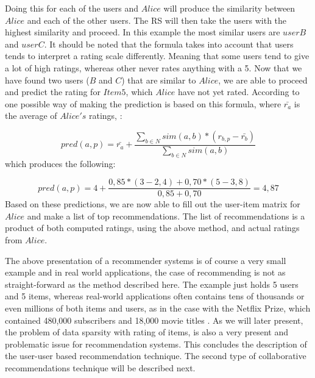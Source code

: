 Doing this for each of the users and \(Alice\) will produce the similarity between \(Alice\) and each of the other users. The RS will then take the users with the highest similarity and proceed. In this example the most similar users are \(userB\) and \(userC\). It should be noted that the formula takes into account that users tends to interpret a rating scale differently. Meaning that some users tend to give a lot of high ratings, whereas other never rates anything with a 5\citep[p. 15]{IntroductionRecommenderSystems}.\newline 
Now that we have found two users (\(B\) and \(C\)) that are similar to \(Alice\), we are able to proceed and predict the rating for \(Item5\), which \(Alice\) have not yet rated. According to \citet[p. 16]{IntroductionRecommenderSystems} one possible way of making the prediction is based on this formula, where $\bar{r_{a}}$ is the average of \(Alice's\) ratings,  :\newline

\[
	pred(a,p) = \bar{r_{a}} + \frac{\sum_{b\in N} sim(a,b) * (r_{b,p} - \bar{r_{b}})}{\sum_{b\in N} sim(a,b)}
\]
which produces the following: \newline

\[
	pred(a,p) = 4 + \frac{0,85*(3-2,4)+0,70*(5-3,8)}{0,85+0,70} = 4,87
\]
Based on these predictions, we are now able to fill out the user-item matrix for \(Alice\) and make a list of top recommendations. The list of recommendations is a product of both computed ratings, using the above method, and actual ratings from \(Alice\). \newline

The above presentation of a recommender systems is of course a very small example and in real world applications, the case of recommending is not as straight-forward as the method described here. The example just holds 5 users and 5 items, whereas real-world applications often contains tens of thousands or even millions of both items and users, as in the case with the Netflix Prize, which contained 480,000 subscribers and 18,000 movie titles \citep{NetflixPrize}. As we will later present, the problem of data sparsity with rating of items, is also a very present and problematic issue for recommendation systems.\newline
This concludes the description of the user-user based recommendation technique. The second type of collaborative recommendations technique will be described next.

